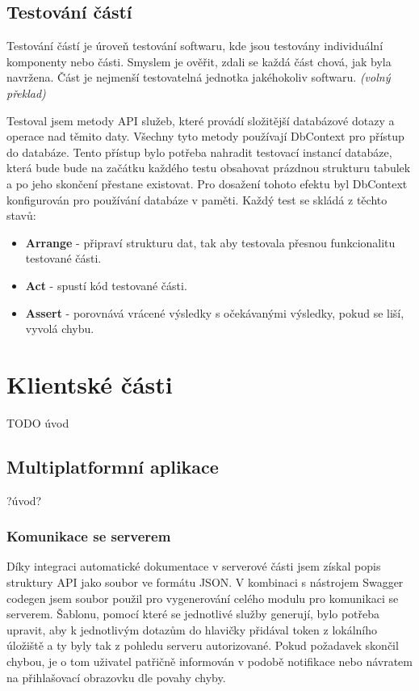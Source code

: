 \documentclass[
  biblatex,
  glossaries,
  index
]{kidiplom}
\begin{document}
\subsection{Testování částí}
Testování částí je úroveň testování softwaru, kde jsou testovány individuální komponenty nebo části. Smyslem je ověřit, zdali se každá část chová, jak byla navržena. Část je nejmenší testovatelná jednotka jakéhokoliv softwaru.\cite{11} \textit{(volný překlad)}

Testoval jsem metody API služeb, které provádí složitější databázové dotazy a operace nad těmito daty. Všechny tyto metody používají DbContext pro přístup do databáze. Tento přístup bylo potřeba nahradit testovací instancí databáze, která bude bude na začátku každého testu obsahovat prázdnou strukturu tabulek a po jeho skončení přestane existovat. Pro dosažení tohoto efektu byl DbContext konfigurován pro používání databáze v paměti. Každý test se skládá z těchto stavů: 
\begin{itemize}
	\item \textbf{Arrange} - připraví strukturu dat, tak aby testovala přesnou funkcionalitu testované části.
	\item \textbf{Act} - spustí kód testované části.
	\item \textbf{Assert} - porovnává vrácené výsledky s očekávanými výsledky, pokud se liší, vyvolá chybu.
\end{itemize}

\newpage

\section{Klientské části}
TODO úvod

\subsection{Multiplatformní aplikace}
?úvod?

\subsubsection{Komunikace se serverem}
Díky integraci automatické dokumentace v serverové části jsem získal popis struktury API jako soubor ve formátu JSON. V kombinaci s nástrojem Swagger codegen jsem soubor použil pro vygenerování celého modulu pro komunikaci se serverem. Šablonu, pomocí které se jednotlivé služby generují, bylo potřeba upravit, aby k jednotlivým dotazům do hlavičky přidával token z lokálního úložiště a ty byly tak z pohledu serveru autorizované. Pokud požadavek skončil chybou, je o tom uživatel patřičně informován v podobě notifikace nebo návratem na přihlašovací obrazovku dle povahy chyby.
\end{document}
